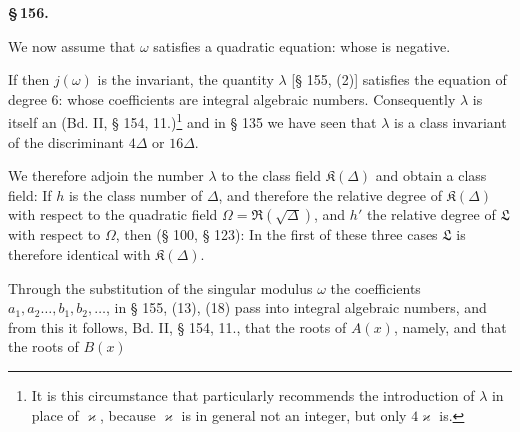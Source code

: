 \begin{center}
\textbf{\S\,156.\qquad {}}
\end{center}

We now assume that $\omega$ satisfies a quadratic
equation:
whose 
is negative.

If then $j(\omega)$ is the invariant, the quantity $\lambda$ [§ 155,
(2)] satisfies the equation of degree 6:
whose coefficients are integral algebraic numbers. Consequently
$\lambda$ is itself an  (Bd. II, § 154, 11.)\footnote{It is this circumstance that particularly recommends the introduction of $\lambda$ in place of $\varkappa$, because $\varkappa$ is in general not an integer, but only $4\varkappa$ is.}
and in § 135 we have seen that $\lambda$ is a class invariant of the
discriminant $4\Delta$ or $16\Delta$.

We therefore adjoin the number $\lambda$ to the class field $\mathfrak{K}(\Delta)$
and obtain a class field:
If $h$ is the class number of $\Delta$, and therefore the relative degree of $\mathfrak{K}(\Delta)$
with respect to the quadratic field $\Omega = \mathfrak{R}(\sqrt{\Delta})$, and $h'$ the
relative degree of $\mathfrak{L}$ with respect to $\Omega$, then (§ 100, § 123):
In the first of these three cases $\mathfrak{L}$ is therefore identical with $\mathfrak{K}(\Delta)$.

Through the substitution of the singular modulus $\omega$ the
coefficients $a_1, a_2 \ldots, b_1, b_2, \ldots$, in § 155, (13), (18) pass into integral
algebraic numbers, and from this it follows, Bd. II, § 154, 11.,
that the roots of $A(x)$, namely,
and that the roots of $B(x)$
